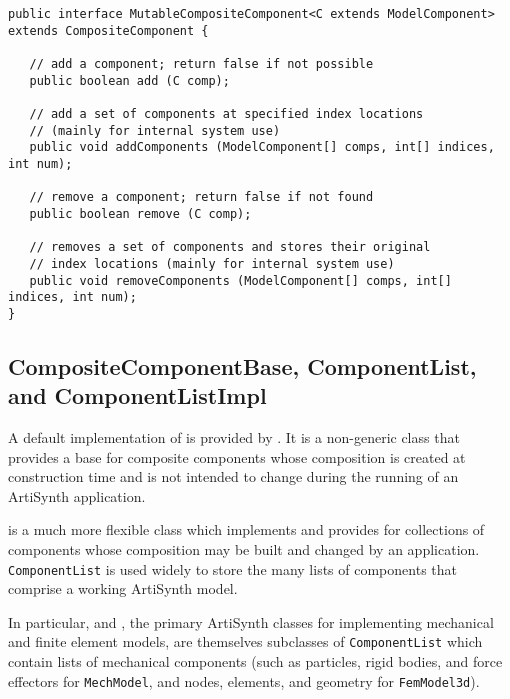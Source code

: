 \documentclass{article}
\begin{document}
\begin{lstlisting}[]
public interface MutableCompositeComponent<C extends ModelComponent>
extends CompositeComponent {

   // add a component; return false if not possible
   public boolean add (C comp);

   // add a set of components at specified index locations
   // (mainly for internal system use)
   public void addComponents (ModelComponent[] comps, int[] indices, int num);

   // remove a component; return false if not found
   public boolean remove (C comp);

   // removes a set of components and stores their original 
   // index locations (mainly for internal system use)
   public void removeComponents (ModelComponent[] comps, int[] indices, int num);
}
\end{lstlisting}

\subsection{CompositeComponentBase, ComponentList, and
ComponentListImpl}
\label{CompositeComponentBaseSec}

A default implementation of
 is provided
by . It is
a non-generic class that provides a base for composite components
whose composition is created at construction time and is not intended
to change during the running of an ArtiSynth application.

 is a much more
flexible class which implements
 and
provides for collections of components whose composition may be built
and changed by an application. {\tt ComponentList} is used widely to
store the many lists of components that comprise a working ArtiSynth
model.

\javabase[]

In particular,  and
, the primary
ArtiSynth classes for implementing mechanical and finite element
models, are themselves subclasses of {\tt ComponentList} 
which contain lists of mechanical components (such as
particles, rigid bodies, and force effectors for {\tt MechModel},
and nodes, elements, and geometry for {\tt FemModel3d}).
\end{document}
